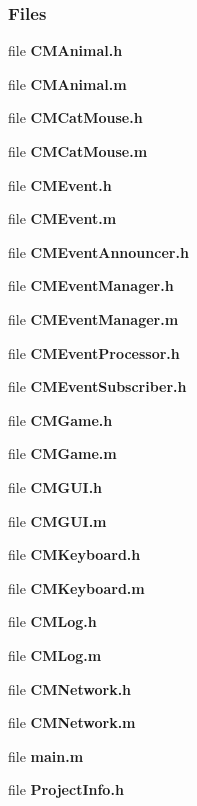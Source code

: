 \subsubsection*{Files}
\begin{DoxyCompactItemize}
\item 
file {\bf C\-M\-Animal.\-h}
\item 
file {\bf C\-M\-Animal.\-m}
\item 
file {\bf C\-M\-Cat\-Mouse.\-h}
\item 
file {\bf C\-M\-Cat\-Mouse.\-m}
\item 
file {\bf C\-M\-Event.\-h}
\item 
file {\bf C\-M\-Event.\-m}
\item 
file {\bf C\-M\-Event\-Announcer.\-h}
\item 
file {\bf C\-M\-Event\-Manager.\-h}
\item 
file {\bf C\-M\-Event\-Manager.\-m}
\item 
file {\bf C\-M\-Event\-Processor.\-h}
\item 
file {\bf C\-M\-Event\-Subscriber.\-h}
\item 
file {\bf C\-M\-Game.\-h}
\item 
file {\bf C\-M\-Game.\-m}
\item 
file {\bf C\-M\-G\-U\-I.\-h}
\item 
file {\bf C\-M\-G\-U\-I.\-m}
\item 
file {\bf C\-M\-Keyboard.\-h}
\item 
file {\bf C\-M\-Keyboard.\-m}
\item 
file {\bf C\-M\-Log.\-h}
\item 
file {\bf C\-M\-Log.\-m}
\item 
file {\bf C\-M\-Network.\-h}
\item 
file {\bf C\-M\-Network.\-m}
\item 
file {\bf main.\-m}
\item 
file {\bf Project\-Info.\-h}
\end{DoxyCompactItemize}
